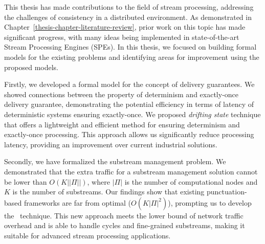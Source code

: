 This thesis has made contributions to the field of stream processing, addressing the challenges of consistency in a distributed environment. As demonstrated in Chapter~\ref{thesis-chapter-literature-review}, prior work on this topic has made significant progress, with many ideas being implemented in state-of-the-art Stream Processing Engines (SPEs). In this thesis, we focused on building formal models for the existing problems and identifying areas for improvement using the proposed models.

Firstly, we developed a formal model for the concept of delivery guarantees. We showed connections between the property of determinism and exactly-once delivery guarantee, demonstrating the potential efficiency in terms of latency of deterministic systems ensuring exactly-once. We proposed {\em drifting state} technique that offers a lightweight and efficient method for ensuring determinism and exactly-once processing. This approach allows us significantly reduce processing latency, providing an improvement over current industrial solutions.

Secondly, we have formalized the substream management problem. We demonstrated that the extra traffic for a substream management solution cannot be lower than $O(K||\Pi||)$, where $|\Pi|$ is the number of computational nodes and $K$ is the number of substreams. Our findings show that existing punctuation-based frameworks are far from optimal ($O(K|\Pi|^2)$), prompting us to develop the \tracker\ technique. This new approach meets the lower bound of network traffic overhead and is able to handle cycles and fine-grained substreams, making it suitable for advanced stream processing applications.

